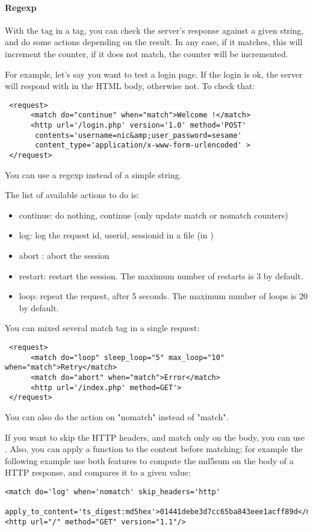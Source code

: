 \documentclass{TSUNG-en}
\begin{document}
\paragraph{Regexp}

With the tag  in a  tag, you can check
the server's response against a given string, and do some actions
depending on the result. In any case, if it matches, this will
increment the  counter, if it does not match, the
 counter will be incremented.

For example, let's say you want to test a login page. If the login is
ok, the server will respond with  in the
HTML body, otherwise not. To check that:
\begin{Verbatim}
 <request>
      <match do="continue" when="match">Welcome !</match>
      <http url='/login.php' version='1.0' method='POST'
       contents='username=nic&amp;user_password=sesame'
       content_type='application/x-www-form-urlencoded' >
 </request>
\end{Verbatim}

You can use a regexp instead of a simple string.

The list of available actions to do is:
\begin{itemize}
\item continue: do nothing, continue (only update match or nomatch counters)
\item log: log the request id, userid, sessionid in a file (in )
\item abort : abort the session
\item restart: restart the session. The maximum number of
  restarts is 3 by default.
\item loop: repeat the request, after 5 seconds. The maximum number of
  loops is 20 by default.
\end{itemize}

You can mixed several match tag in a single request:
\begin{Verbatim}
 <request>
      <match do="loop" sleep_loop="5" max_loop="10" when="match">Retry</match>
      <match do="abort" when="match">Error</match>
      <http url='/index.php' method=GET'>
 </request>
\end{Verbatim}

You can also do the action on "nomatch" instead of "match".


If you want to skip the HTTP headers, and match only on the body, you
can use . Also, you can apply a
function to the content before matching; for example the following
example use both features to compute the md5sum on the body of a HTTP
response, and compares it to a given value:
\begin{Verbatim}
<match do='log' when='nomatch' skip_headers='http'
  apply_to_content='ts_digest:md5hex'>01441debe3d7cc65ba843eee1acff89d</match>
<http url="/" method="GET" version="1.1"/>
\end{Verbatim}
\end{document}
